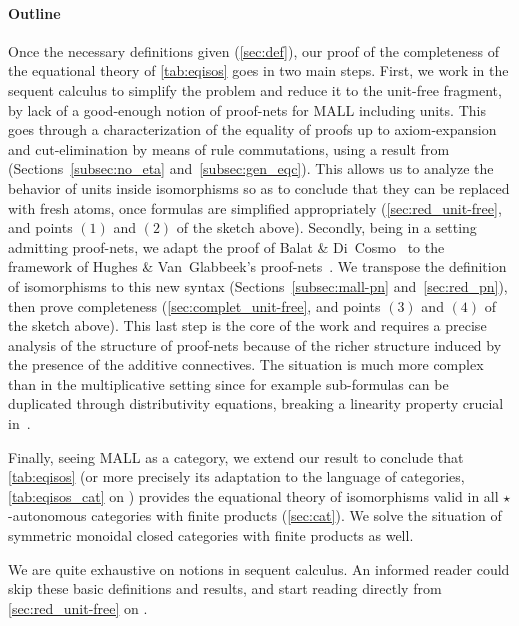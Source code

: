 \documentclass{lmcs}
\begin{document}
\paragraph{Outline}
Once the necessary definitions given (\autoref{sec:def}), our proof of the completeness of the equational theory of \autoref{tab:eqisos} goes in two main steps.
First, we work in the sequent calculus to simplify the problem and reduce it to the unit-free fragment, by lack of a good-enough notion of proof-nets for MALL including units.
This goes through a characterization of the equality of proofs up to axiom-expansion and cut-elimination by means of rule commutations, using a result from~\cite{calculusformall} (Sections~\ref{subsec:no_eta} and~\ref{subsec:gen_eqc}).
This allows us to analyze the behavior of units inside isomorphisms so as to conclude that they can be replaced with fresh atoms, once formulas are simplified appropriately (\autoref{sec:red_unit-free}, and points $(1)$ and $(2)$ of the sketch above).
Secondly, being in a setting admitting proof-nets, we adapt the proof of Balat \& Di~Cosmo~\cite{mllisos} to the framework of Hughes \& Van~Glabbeek's proof-nets~\cite{mallpnlong}.
We transpose the definition of isomorphisms to this new syntax (Sections~\ref{subsec:mall-pn} and~\ref{sec:red_pn}), then prove completeness (\autoref{sec:complet_unit-free}, and points $(3)$ and $(4)$ of the sketch above).
This last step is the core of the work and requires a precise analysis of the structure of proof-nets because of the richer structure induced by the presence of the additive connectives.
The situation is much more complex than in the multiplicative setting since for example sub-formulas can be duplicated through distributivity equations, breaking a linearity property crucial in~\cite{mllisos}.

Finally, seeing MALL as a category, we extend our result to conclude that \autoref{tab:eqisos} (or more precisely its adaptation to the language of categories, \autoref{tab:eqisos_cat} on ) provides the equational theory of isomorphisms valid in all $\star$-autonomous categories with finite products (\autoref{sec:cat}).
We solve the situation of symmetric monoidal closed categories with finite products as well.

We are quite exhaustive on notions in sequent calculus.
An informed reader could skip these basic definitions and results, and start reading directly from \autoref{sec:red_unit-free} on .

\end{document}
